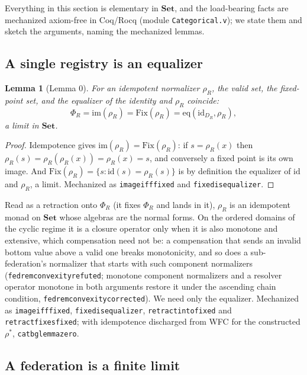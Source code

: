\documentclass[11pt,a4paper]{article}
\theoremstyle{plain}
\newtheorem{lemma}[theorem]{Lemma}
\theoremstyle{definition}
\theoremstyle{remark}
\renewcommand{\_}{\origunderscore\allowbreak}
\begin{document}
Everything in this section is elementary in $\mathbf{Set}$, and the load-bearing facts are mechanized
axiom-free in Coq/Rocq (module \texttt{Categorical.v}); we state them and sketch the arguments,
naming the mechanized lemmas.

\subsection{A single registry is an equalizer}

\begin{lemma}[Lemma 0]
\label{lem:zero}
For an idempotent normalizer $\rho_R$, the valid set, the fixed-point set, and the equalizer of the
identity and $\rho_R$ coincide:
\[ \Phi_R = \mathrm{im}(\rho_R) = \mathrm{Fix}(\rho_R) = \mathrm{eq}(\mathrm{id}_{D_R}, \rho_R), \]
a limit in $\mathbf{Set}$.
\end{lemma}
\begin{proof}
Idempotence gives $\mathrm{im}(\rho_R) = \mathrm{Fix}(\rho_R)$: if $s = \rho_R(x)$ then
$\rho_R(s) = \rho_R(\rho_R(x)) = \rho_R(x) = s$, and conversely a fixed point is its own image. And
$\mathrm{Fix}(\rho_R) = \{s : \mathrm{id}(s) = \rho_R(s)\}$ is by definition the equalizer of
$\mathrm{id}$ and $\rho_R$, a limit. Mechanized as \texttt{image\_iff\_fixed} and
\texttt{fixed\_is\_equalizer}.
\end{proof}

Read as a retraction onto $\Phi_R$ (it fixes $\Phi_R$ and lands in it), $\rho_R$ is an idempotent
monad on $\mathbf{Set}$ whose algebras are the normal forms. On the ordered domains of the cyclic
regime it is a closure operator only when it is also monotone and extensive, which compensation need
not be: a compensation that sends an invalid bottom value above a valid one breaks monotonicity, and
so does a sub-federation's normalizer that starts with such component normalizers
(\texttt{fed\_rem\_convexity\_refuted}; monotone component normalizers and a resolver operator
monotone in both arguments restore it under the ascending chain condition,
\texttt{fed\_rem\_convexity\_corrected}). We need only the equalizer.
Mechanized as \texttt{image\_iff\_fixed}, \texttt{fixed\_is\_equalizer},
\texttt{retract\_into\_fixed} and \texttt{retract\_fixes\_fixed}; with idempotence discharged from
WFC for the constructed $\rho^*$, \texttt{cat\_bg\_lemma\_zero}.

\subsection{A federation is a finite limit}
\end{document}
